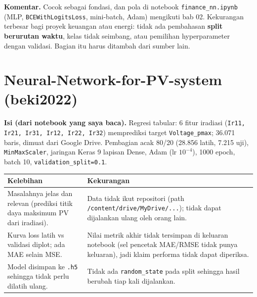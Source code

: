 \documentclass[11pt,a4paper]{article}
\newcommand{\bad}[1]{\textcolor{red!70!black}{#1}}
\begin{document}
\textbf{Komentar.} Cocok sebagai fondasi, dan pola di notebook \texttt{finance\_nn.ipynb} (MLP, \texttt{BCEWithLogitsLoss}, mini-batch, Adam) mengikuti bab 02. Kekurangan terbesar bagi proyek keuangan atau energi: tidak ada pembahasan \textbf{split berurutan waktu}, kelas tidak seimbang, atau pemilihan hyperparameter dengan validasi. Bagian itu harus ditambah dari sumber lain.

\section{Neural-Network-for-PV-system (beki2022)}
\textbf{Isi (dari notebook yang saya baca).} Regresi tabular: 6 fitur iradiasi (\texttt{Ir11, Ir21, Ir31, Ir12, Ir22, Ir32}) memprediksi target \texttt{Voltage\_pmax}; 36.071 baris, dimuat dari Google Drive. Pembagian acak 80/20 (28.856 latih, 7.215 uji), \texttt{MinMaxScaler}, jaringan Keras 9 lapisan Dense, Adam (lr $10^{-4}$), 1000 epoch, batch 10, \texttt{validation\_split=0.1}.

\begin{tabular}{@{}>{\raggedright\arraybackslash}p{}>{\raggedright\arraybackslash}p{}@{}}
\toprule
\textbf{Kelebihan} & \textbf{Kekurangan} \\
\midrule
Masalahnya jelas dan relevan (prediksi titik daya maksimum PV dari iradiasi). &
\bad{Data tidak ikut repositori} (path \texttt{/content/drive/MyDrive/...}); tidak dapat dijalankan ulang oleh orang lain. \\
Kurva loss latih vs validasi diplot; ada MAE selain MSE. &
\bad{Nilai metrik akhir tidak tersimpan} di keluaran notebook (sel pencetak MAE/RMSE tidak punya keluaran), jadi klaim performa tidak dapat diperiksa. \\
Model disimpan ke \texttt{.h5} sehingga tidak perlu dilatih ulang. &
Tidak ada \texttt{random\_state} pada split sehingga hasil berubah tiap kali dijalankan. \\
\bottomrule
\end{tabular}
\end{document}
